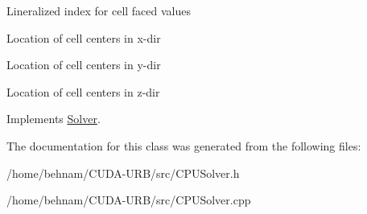 Lineralized index for cell faced values

Location of cell centers in x-\/dir

Location of cell centers in y-\/dir

Location of cell centers in z-\/dir 

Implements \hyperlink{classSolver}{Solver}.



The documentation for this class was generated from the following files\+:\begin{DoxyCompactItemize}
\item 
/home/behnam/\+C\+U\+D\+A-\/\+U\+R\+B/src/C\+P\+U\+Solver.\+h\item 
/home/behnam/\+C\+U\+D\+A-\/\+U\+R\+B/src/C\+P\+U\+Solver.\+cpp\end{DoxyCompactItemize}
